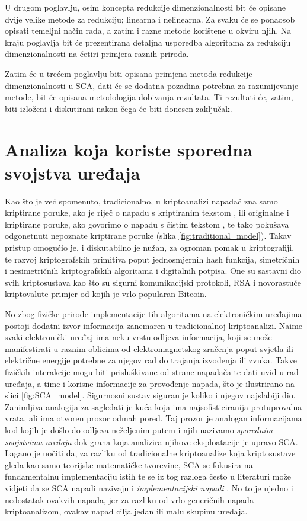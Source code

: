 \documentclass[times, utf8, diplomski]{fer}
\begin{document}
U drugom poglavlju, osim koncepta redukcije dimenzionalnosti bit će opisane dvije velike metode za redukciju; linearna i nelinearna. Za svaku će se ponaosob opisati temeljni način rada, a zatim i razne metode korištene u okviru njih. Na kraju poglavlja bit će prezentirana detaljna usporedba algoritama za redukciju dimenzionalnosti na četiri primjera raznih priroda.

Zatim će u trećem poglavlju biti opisana primjena metoda redukcije dimenzionalnosti u SCA, dati će se dodatna pozadina potrebna za razumijevanje metode, bit će opisana metodologija dobivanja rezultata. Ti rezultati će, zatim, biti izloženi i diskutirani nakon čega će biti donesen zaključak.

\chapter{Analiza koja koriste sporedna svojstva uređaja}

Kao što je već spomenuto, tradicionalno, u kriptoanalizi napadač  zna samo kriptirane poruke, ako je riječ o napadu s kriptiranim tekstom , ili originalne i kriptirane poruke, ako govorimo o napadu s čistim tekstom , te tako pokušava odgonetnuti nepoznate kriptirane poruke (slika \ref{fig:traditional_model}). Takav pristup omogućio je, i diskutabilno je nužan, za ogroman pomak u kriptografiji, te razvoj kriptografskih primitiva poput jednosmjernih hash funkcija, simetričnih i nesimetričnih kriptografskih algoritama i digitalnih potpisa. One su sastavni dio svih kriptosustava kao što su sigurni komunikacijski protokoli, RSA i novorastuće kriptovalute primjer od kojih je vrlo popularan Bitcoin.

No zbog fizičke prirode implementacije tih algoritama na elektroničkim uređajima postoji dodatni izvor informacija zanemaren u tradicionalnoj kriptoanalizi. Naime svaki elektronički uređaj ima neku vrstu odljeva informacija, koji se može manifestirati u raznim oblicima od elektromagnetskog zračenja poput svjetla ili električne energije potrebne za njegov rad do trajanja izvođenja ili zvuka. Takve fizičkih interakcije mogu biti prisluškivane od strane napadača te dati uvid u rad uređaja, a time i korisne informacije za provođenje napada, što je ilustrirano na slici \ref{fig:SCA_model}. Sigurnosni sustav siguran je koliko i njegov najslabiji dio. Zanimljiva analogija za sagledati je kuća koja ima najsofisticiranija protuprovalna vrata, ali ima otvoren prozor odmah pored. Taj prozor je analogan informacijama kod kojih je došlo do odljeva neželjenim putem i njih nazivamo \emph{sporednim svojstvima uređaja}  dok grana koja analizira njihove eksploatacije je upravo SCA. Lagano je uočiti da, za razliku od tradicionalne kriptoanalize koja kriptosustave gleda kao samo teorijske matematičke tvorevine, SCA se fokusira na fundamentalnu implementaciju istih te se iz tog razloga često u literaturi može vidjeti da se SCA napadi nazivaju i \emph{implementacijski napadi} . No to je ujedno i nedostatak ovakvih napada, jer za razliku od vrlo generičnih napada kriptoanalizom, ovakav napad cilja jedan ili malu skupinu uređaja.
\end{document}
